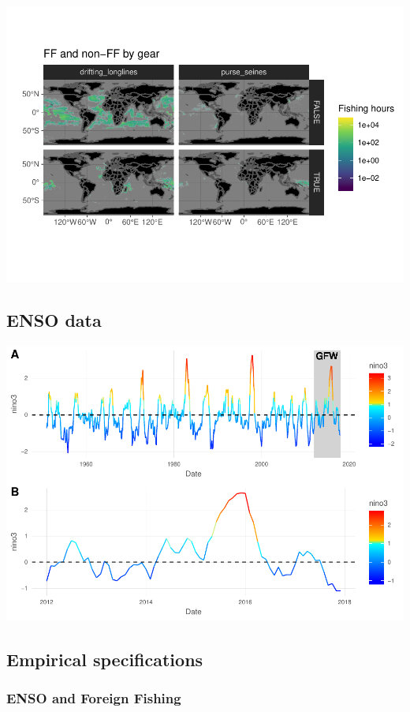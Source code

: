 \documentclass[]{article}
\begin{document}
\includegraphics{Oremus_Villasenor-Derbez_files/figure-latex/unnamed-chunk-3-1.pdf}

\subsection{ENSO data}\label{enso-data}

\includegraphics{Oremus_Villasenor-Derbez_files/figure-latex/unnamed-chunk-5-1.pdf}

\subsection{Empirical specifications}\label{empirical-specifications}

\subsubsection{ENSO and Foreign Fishing}\label{enso-and-foreign-fishing}
\end{document}
